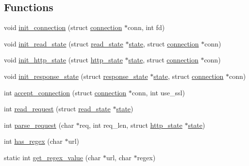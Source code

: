\subsection*{Functions}
\begin{DoxyCompactItemize}
\item 
void \hyperlink{connection-handler_8c_a9e4f80d42f79c16c463443629b480b75}{init\-\_\-connection} (struct \hyperlink{structconnection}{connection} $\ast$conn, int fd)
\item 
void \hyperlink{connection-handler_8c_af82ade39f14338cc7e30798368452364}{init\-\_\-read\-\_\-state} (struct \hyperlink{structread__state}{read\-\_\-state} $\ast$\hyperlink{http__parser_8c_adc6e5733fc3c22f0a7b2914188c49c90}{state}, struct \hyperlink{structconnection}{connection} $\ast$conn)
\item 
void \hyperlink{connection-handler_8c_ac4d0e53d85b747ae364c2d65686e9bc3}{init\-\_\-http\-\_\-state} (struct \hyperlink{structhttp__state}{http\-\_\-state} $\ast$\hyperlink{http__parser_8c_adc6e5733fc3c22f0a7b2914188c49c90}{state}, struct \hyperlink{structconnection}{connection} $\ast$conn)
\item 
void \hyperlink{connection-handler_8c_a15d9f343d7b0a10ca8fc2643821bbd2d}{init\-\_\-response\-\_\-state} (struct \hyperlink{structresponse__state}{response\-\_\-state} $\ast$\hyperlink{http__parser_8c_adc6e5733fc3c22f0a7b2914188c49c90}{state}, struct \hyperlink{structconnection}{connection} $\ast$conn)
\item 
int \hyperlink{connection-handler_8c_a8b0520ef94350639d01d226c01f1e0d3}{accept\-\_\-connection} (struct \hyperlink{structconnection}{connection} $\ast$conn, int use\-\_\-ssl)
\item 
int \hyperlink{connection-handler_8c_a45111b168f72434544555058f1bdc047}{read\-\_\-request} (struct \hyperlink{structread__state}{read\-\_\-state} $\ast$\hyperlink{http__parser_8c_adc6e5733fc3c22f0a7b2914188c49c90}{state})
\item 
int \hyperlink{connection-handler_8c_af06abb9d08854f0672082140a01dd0f8}{parse\-\_\-request} (char $\ast$req, int req\-\_\-len, struct \hyperlink{structhttp__state}{http\-\_\-state} $\ast$\hyperlink{http__parser_8c_adc6e5733fc3c22f0a7b2914188c49c90}{state})
\item 
int \hyperlink{connection-handler_8c_aad4e23d034482bdd8a28174ff70d3ea0}{has\-\_\-regex} (char $\ast$url)
\item 
static int \hyperlink{connection-handler_8c_a862eb9ffd13a2a8c757abd66cec3f033}{get\-\_\-regex\-\_\-value} (char $\ast$url, char $\ast$regex)

\end{DoxyCompactItemize}

